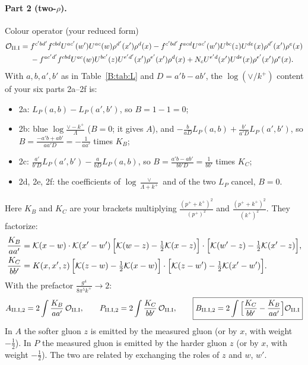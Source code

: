 \documentclass[10pt]{article}
\numberwithin{equation}{section}
\newcommand{\KK}{\mathcal K}
\newcommand{\kp}{k^+}
\newcommand{\pp}{p^+}
\begin{document}
\paragraph{Part 2 (two-$\rho$).} Colour operator (your reduced form)
\begin{align*}
\mathcal O_{\rm II.I}={}&f^{c'bd'}f^{cbd}U^{ac'}(w')U^{ac}(w)\rho^{d'}(x')\rho^d(x)-f^{c'bd'}f^{acd}U^{ac'}(w')U^{bc}(z)U^{de}(x)\rho^{d'}(x')\rho^e(x)\\
&-f^{ac'd'}f^{cbd}U^{ac}(w)U^{bc'}(z)U^{e'd'}(x')\rho^{e'}(x')\rho^d(x)+N_cU^{e'd}(x')U^{de}(x)\rho^{e'}(x')\rho^e(x).
\end{align*}
With $a,b,a',b'$ as in Table~\ref{B:tab:L} and $D=a'b-ab'$, the $\log(\vee/k^+)$ content of your six parts 2a--2f is:
\begin{itemize}
\item 2a: $L_P(a,b)-L_P(a',b')$, so $B=1-1=0$;
\item 2b: blue $\log\frac{\vee-k^+}{\Lambda}$ ($B=0$; it gives $A$), and $-\frac{b}{aD}L_P(a,b)+\frac{b'}{a'D}L_P(a',b')$, so $B=\frac{-a'b+ab'}{aa'D}=-\frac{1}{aa'}$ times $K_B$;
\item 2c: $\frac{a'}{b'D}L_P(a',b')-\frac{a}{bD}L_P(a,b)$, so $B=\frac{a'b-ab'}{bb'D}=\frac{1}{bb'}$ times $K_C$;
\item 2d, 2e, 2f: the coefficients of $\log\frac{\vee}{\Lambda+k^+}$ and of the two $L_P$ cancel, $B=0$.
\end{itemize}
Here $K_B$ and $K_C$ are your brackets multiplying $\frac{(\pp+\kp)^2}{(\pp)^2}$ and $\frac{(\pp+\kp)^2}{(\kp)^2}$. They factorize:
\begin{align}
\frac{K_B}{aa'}&=\KK(x-w)\cdot\KK(x'-w')\,\Big[\KK(w-z)-\tfrac12\KK(x-z)\Big]\cdot\Big[\KK(w'-z)-\tfrac12\KK(x'-z)\Big],\notag\\
\frac{K_C}{bb'}&=K(x,x',z)\,\Big[\KK(z-w)-\tfrac12\KK(x-w)\Big]\cdot\Big[\KK(z-w')-\tfrac12\KK(x'-w')\Big].
\end{align}
With the prefactor $\frac{g^4}{8\pi^5k^+}\to2$:
\begin{equation}
A_{\rm II.I,2}=2\int\frac{K_B}{aa'}\,\mathcal O_{\rm II.I},\qquad P_{\rm II.I,2}=2\int\frac{K_C}{bb'}\,\mathcal O_{\rm II.I},\qquad
\boxed{B_{\rm II.I,2}=2\int\Big[\frac{K_C}{bb'}-\frac{K_B}{aa'}\Big]\mathcal O_{\rm II.I}}
\end{equation}
In $A$ the softer gluon $z$ is emitted by the measured gluon (or by $x$, with weight $-\frac12$). In $P$ the measured gluon is emitted by the harder gluon $z$ (or by $x$, with weight $-\frac12$). The two are related by exchanging the roles of $z$ and $w$, $w'$.
\end{document}
